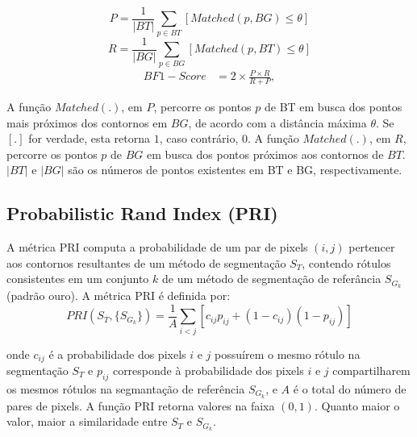 \documentclass[
	12pt,				%
	oneside,			%
	a4paper,			%
	sumario=tradicional,
	english,			%
	french,				%
	spanish,			%
	brazil,				%
]{abntex2}
\begin{document}
\begin{equation}\label{eq:p:metric}
P = 
\frac{1}{|BT|} \sum_{p \in BT }^{}[Matched(p,BG) \leq \theta]
\end{equation}
\begin{equation}\label{eq:r:metric}
R = 
\frac{1}{|BG|}\sum_{p \in BG}^{}[Matched(p,BT) \leq \theta]
\end{equation}
\begin{equation}\label{eq:f:metric}
 	\begin{split}
		BF1-Score &= 2 \times{\frac{P \times R}{ R+P}},
    \end{split}
\end{equation}

A função  $Matched(.)$, em $P$, percorre os pontos $p$ de BT em busca dos pontos mais próximos dos contornos em $BG$, de acordo com a distância máxima $\theta$. Se $[.]$ for verdade, esta retorna $1$, caso contrário, $0$. A função $Matched(.)$, em $R$, percorre os pontos $p$ de $BG$ em busca dos pontos próximos aos contornos de $BT$. $|BT|$ e $|BG|$ são os números de pontos existentes em BT e BG, respectivamente.

\subsection{Probabilistic Rand Index (PRI)}
A métrica PRI \cite{Unnikrishnan} computa a probabilidade de um par de pixels $(i,j)$ pertencer aos contornos resultantes de um método de segmentação $S_{T}$, contendo rótulos consistentes em um conjunto $k$ de um método de segmentação de referância $S_{G_{k}}$ (padrão ouro). A métrica PRI é definida por:
\begin{equation}
    \label{eq:pri}
    PRI(S_{T}, \{S_{G_k}\})=\frac{1}{A}\sum_{i<j}^{}\left[c_{ij}p_{ij}+(1-c_{ij})(1-p_{ij})\right]
\end{equation}

\noindent onde $c_{ij}$ é a probabilidade dos pixels $i$ e $j$ possuírem o mesmo rótulo na segmentação $S_T$ e $p_{ij}$ corresponde à probabilidade dos pixels $i$ e $j$ compartilharem os mesmos rótulos na segmantação de referência $S_{G_{k}}$, e $A$ é o total do número de pares de pixels. A função PRI retorna valores na faixa $(0,1)$. Quanto maior o valor, maior a similaridade entre $S_{T}$ e $S_{G_{k}}$.


\end{document}
